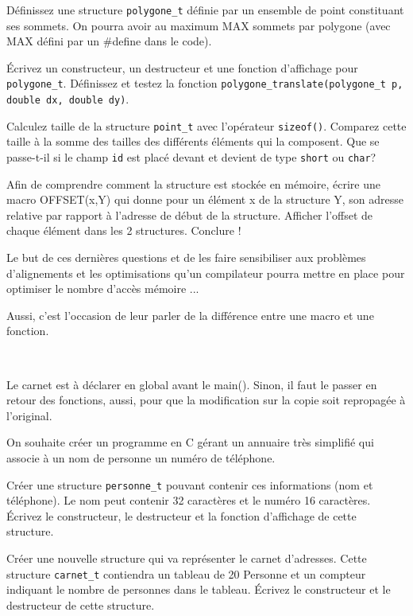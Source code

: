 \documentclass[10pt]{article}\usepackage[correction,nu]{esial}
\begin{document}
\Question Définissez une structure \texttt{polygone\_t} définie par un
ensemble de point constituant ses sommets. On pourra avoir au maximum
MAX sommets par polygone (avec MAX défini par un \#define dans le code).

\Question Écrivez un constructeur, un destructeur et une fonction
d'affichage pour \texttt{polygone\_t}.  Définissez et testez la
fonction \texttt{polygone\_translate(polygone\_t p, double dx, double
  dy)}.

\Question Calculez taille de la structure \texttt{point\_t} avec
l'opérateur \texttt{sizeof()}. Comparez cette taille à la somme des
tailles des différents éléments qui la composent. Que se passe-t-il si
le champ \texttt{id} est placé devant et devient de type
\texttt{short} ou \texttt{char}? 

\Question Afin de comprendre comment la structure est stockée en
mémoire, écrire une macro OFFSET(x,Y) qui donne pour un élément x de
la structure Y, son adresse relative par rapport à l'adresse de début
de la structure. Afficher l'offset de chaque élément dans les 2
structures. Conclure !

\begin{Reponse}
Le but de ces dernières questions et de les faire sensibiliser aux
problèmes d'alignements et les optimisations qu'un compilateur pourra
mettre en place pour optimiser le nombre d'accès mémoire ...

Aussi, c'est l'occasion de leur parler de la différence entre une
macro et une fonction.
\end{Reponse}

\bigskip\bigskip\Exercice
~
\begin{Reponse}
  Le carnet est à déclarer en global avant le main(). Sinon, il faut
  le passer en retour des fonctions, aussi, pour que la modification
  sur la copie soit repropagée à l'original.
\end{Reponse}

On souhaite créer un programme en C gérant un annuaire très simplifié qui
associe à un nom de personne un numéro de téléphone.

\Question Créer une structure \texttt{personne\_t} pouvant contenir
ces informations (nom et téléphone). Le nom peut contenir 32
caractères et le numéro 16 caractères. Écrivez le constructeur, le
destructeur et la fonction d'affichage de cette structure.

\Question Créer une nouvelle structure qui va représenter le carnet
d'adresses.  Cette structure \texttt{carnet\_t} contiendra un tableau
de 20 Personne et un compteur indiquant le nombre de personnes dans le
tableau. Écrivez le constructeur et le destructeur de cette structure.
\end{document}
